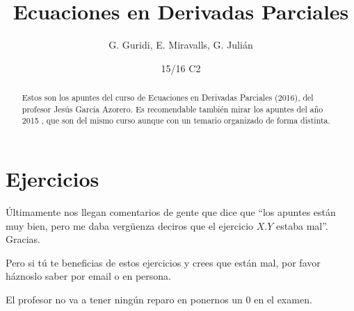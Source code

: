 \documentclass[bibnumbers, palatino]{apuntes}
\title{Ecuaciones en Derivadas Parciales}
\author{G. Guridi, E. Miravalls, G. Julián}
\date{15/16 C2}
\begin{document}
\pagestyle{plain}


\begin{abstract}
Estos son los apuntes del curso de Ecuaciones en Derivadas Parciales (2016), del profesor Jesús García Azorero. Es recomendable también mirar los apuntes del año 2015 \cite{ApuntesEDPRual}, que son del mismo curso aunque con un temario organizado de forma distinta.
\end{abstract}

\maketitle

\tableofcontents
\newpage









\appendix



\chapter{Ejercicios}

Últimamente nos llegan comentarios de gente que dice que ``los apuntes están muy bien, pero me daba vergüenza deciros que el ejercicio $X.Y$ estaba mal''. Gracias.

Pero si tú te beneficias de estos ejercicios y crees que están mal, por favor háznoslo saber por email o en persona.

El profesor no va a tener ningún reparo en ponernos un 0 en el examen.






{}
\printindex
\end{document}
